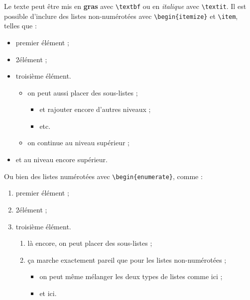 \documentclass{ceri}
\begin{document}
Le texte peut être mis en \textbf{gras} avec \texttt{\textbackslash{}textbf} ou en \textit{italique} avec \texttt{\textbackslash{}textit}. Il est possible d'inclure des listes non-numérotées avec \texttt{\textbackslash{}begin\{itemize\}} et \texttt{\textbackslash{}item}, telles que :	
\begin{itemize}
	\item premier élément ;
	\item 2\ieme élément ;
	\item troisième élément.
	\begin{itemize}
		\item on peut aussi placer des sous-listes ;
		\begin{itemize}
			\item et rajouter encore d'autres niveaux ;
			\item etc.
		\end{itemize}
		\item on continue au niveau supérieur ;
	\end{itemize}
	\item et au niveau encore supérieur.
\end{itemize}

Ou bien des listes numérotées avec \texttt{\textbackslash{}begin\{enumerate\}}, comme :
\begin{enumerate}
	\item premier élément ;
	\item 2\ieme élément ;
	\item troisième élément.
	\begin{enumerate}
		\item là encore, on peut placer des sous-listes ;
		\item ça marche exactement pareil que pour les listes non-numérotées ;
		\begin{itemize}
			\item on peut même mélanger les deux types de listes comme ici ;
			\item et ici.
		\end{itemize}
	\end{enumerate}
\end{enumerate}
	
\end{document}
